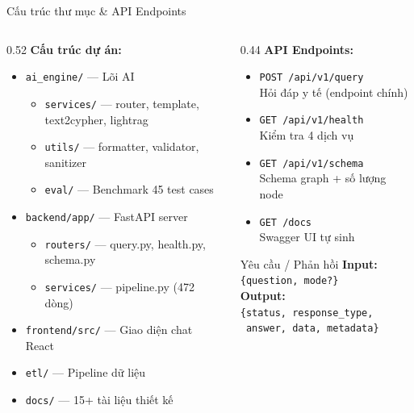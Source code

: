 \documentclass[aspectratio=169, 11pt]{beamer}
\begin{document}
\begin{frame}{Cấu trúc thư mục \& API Endpoints}
  \begin{columns}[t]
    \begin{column}{0.52\textwidth}
      \textbf{Cấu trúc dự án:}
      \begin{itemize}
        \scriptsize
        \item \texttt{ai\_engine/} --- Lõi AI
          \begin{itemize}
            \item \texttt{services/} --- router, template, text2cypher, lightrag
            \item \texttt{utils/} --- formatter, validator, sanitizer
            \item \texttt{eval/} --- Benchmark 45 test cases
          \end{itemize}
        \item \texttt{backend/app/} --- FastAPI server
          \begin{itemize}
            \item \texttt{routers/} --- query.py, health.py, schema.py
            \item \texttt{services/} --- pipeline.py (472 dòng)
          \end{itemize}
        \item \texttt{frontend/src/} --- Giao diện chat React
        \item \texttt{etl/} --- Pipeline dữ liệu
        \item \texttt{docs/} --- 15+ tài liệu thiết kế
      \end{itemize}
    \end{column}
    \begin{column}{0.44\textwidth}
      \textbf{API Endpoints:}
      \begin{itemize}
        \scriptsize
        \item \texttt{POST /api/v1/query}\\Hỏi đáp y tế (endpoint chính)
        \item \texttt{GET /api/v1/health}\\Kiểm tra 4 dịch vụ
        \item \texttt{GET /api/v1/schema}\\Schema graph + số lượng node
        \item \texttt{GET /docs}\\Swagger UI tự sinh
      \end{itemize}
      \vspace{0.4em}
      \begin{block}{Yêu cầu / Phản hồi}
        \scriptsize
        \textbf{Input:} \texttt{\{question, mode?\}}\\[3pt]
        \textbf{Output:}\\
        \texttt{\{status, response\_type,}\\
        \texttt{\ answer, data, metadata\}}
      \end{block}
    \end{column}
  \end{columns}
\end{frame}
\end{document}
